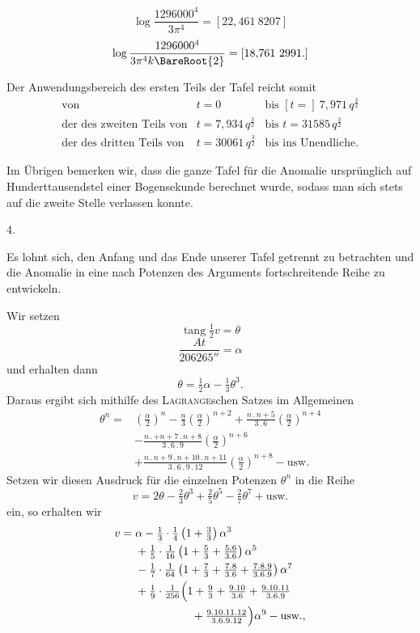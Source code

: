 \[
\log\frac{1296000^4}{3\pi^4}=[22{,}461\ 8207]
\]
\[
\log\frac{1296000^4}{3\pi^4k\BareRoot{2}}=[18{,}761\ 2991.]
\]
\par
Der Anwendungsbereich des ersten Teils der Tafel reicht somit
\[
\begin{array}{rll}
\text{von}&t=0&\text{bis }[t=]\ 7{,}971\,q^{\frac32}\\
\text{der des zweiten Teils von}&t=7{,}934\,q^{\frac32}&\text{bis }t=31585\,q^{\frac32}\\
\text{der des dritten Teils von}&t=30061\,q^{\frac32}&\text{bis ins Unendliche.}
\end{array}
\]
\par
Im Übrigen bemerken wir, dass die ganze Tafel für die Anomalie ursprünglich auf Hunderttausendstel einer Bogensekunde berechnet wurde, sodass man sich stets auf die zweite Stelle verlassen konnte.
\par\medskip
{}
\begin{center}4.\end{center}
\noindent\hspace*{\parindent}Es lohnt sich, den Anfang und das Ende unserer Tafel getrennt zu betrachten und die Anomalie in eine nach Potenzen des Arguments fortschreitende Reihe zu entwickeln.
\par
Wir setzen
\[
\operatorname{tang}\tfrac12v=\theta
\]
\[
\frac{At}{206265''}=\alpha
\]
und erhalten dann
\[
\theta=\tfrac12\alpha-\tfrac13\theta^3.
\]
Daraus ergibt sich mithilfe des \textsc{Lagrange}schen Satzes im Allgemeinen
\[
\begin{aligned}
\theta^n={}&\left(\frac{\alpha}{2}\right)^n-\frac{n}{3}\left(\frac{\alpha}{2}\right)^{n+2}
+\frac{n\mathpunct{.}n+5}{3\mathpunct{.}6}\left(\frac{\alpha}{2}\right)^{n+4}\\
&-\frac{n\mathpunct{.}+n+7\mathpunct{.}n+8}{3\mathpunct{.}6\mathpunct{.}9}\left(\frac{\alpha}{2}\right)^{n+6}\\
&+\frac{n\mathpunct{.}n+9\mathpunct{.}n+10\mathpunct{.}n+11}{3\mathpunct{.}6\mathpunct{.}9\mathpunct{.}12}\left(\frac{\alpha}{2}\right)^{n+8}-\text{usw.}
\end{aligned}
\]
Setzen wir diesen Ausdruck für die einzelnen Potenzen \(\theta^n\) in die Reihe
\[
v=2\theta-\tfrac23\theta^3+\tfrac25\theta^5-\tfrac27\theta^7+\text{usw.}
\]
ein, so erhalten wir
\[
\begin{aligned}
v={}&\alpha-\tfrac13\cdot\tfrac14\left(1+\tfrac33\right)\alpha^3\\
&+\tfrac15\cdot\tfrac1{16}\left(1+\tfrac53+\tfrac{5\mathpunct{.}6}{3\mathpunct{.}6}\right)\alpha^5\\
&-\tfrac17\cdot\tfrac1{64}\left(1+\tfrac73+\tfrac{7\mathpunct{.}8}{3\mathpunct{.}6}+\tfrac{7\mathpunct{.}8\mathpunct{.}9}{3\mathpunct{.}6\mathpunct{.}9}\right)\alpha^7\\
&+\tfrac19\cdot\tfrac1{256}\Bigl(1+\tfrac93+\tfrac{9\mathpunct{.}10}{3\mathpunct{.}6}+\tfrac{9\mathpunct{.}10\mathpunct{.}11}{3\mathpunct{.}6\mathpunct{.}9}\\
&\hspace{5em}+\tfrac{9\mathpunct{.}10\mathpunct{.}11\mathpunct{.}12}{3\mathpunct{.}6\mathpunct{.}9\mathpunct{.}12}\Bigr)\alpha^9-\text{usw.,}
\end{aligned}
\]
